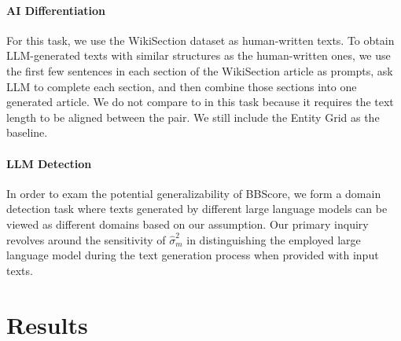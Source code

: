 \documentclass[letterpaper]{article} %
\begin{document}
\paragraph{AI Differentiation} For this task, we use the WikiSection dataset as human-written texts. To obtain LLM-generated texts with similar structures as the human-written ones, we use the first few sentences in each section of the WikiSection article as prompts, ask LLM to complete each section, and then combine those sections into one generated article. We do not compare to \citet{moon-etal-2019-unified} in this task because it requires the text length to be aligned between the pair. We still include the Entity Grid as the baseline.

\paragraph{LLM Detection} In order to exam the potential generalizability of BBScore, we form a domain detection task where texts generated by different large language models can be viewed as different domains based on our assumption. Our primary inquiry revolves around the sensitivity of $\hat\sigma^2_m$ in distinguishing the employed large language model during the text generation process when provided with input texts.

\section{Results}
\label{sec:results}

\begin{table}[ht]
\centering
\small
{}
\caption{Global Discrimination Task Results on WikiSection}
\label{wiki-global}
\end{table}
\end{document}
